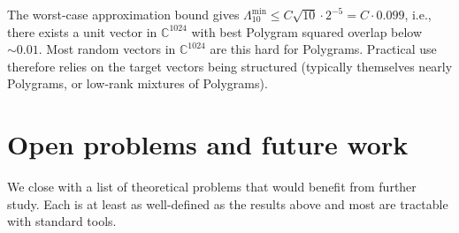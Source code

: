 \documentclass[11pt,letterpaper]{article}
\theoremstyle{definition}
\newcommand{\C}{\mathbb{C}}
\begin{document}
The worst-case approximation bound gives $\Lambda^{\min}_{10} \leq C \sqrt{10}
\cdot 2^{-5} = C \cdot 0.099$, i.e., there exists a unit vector in $\C^{1024}$
with best Polygram squared overlap below $\sim 0.01$. Most random vectors
in $\C^{1024}$ are this hard for Polygrams. Practical use therefore relies on
the target vectors being structured (typically themselves nearly Polygrams,
or low-rank mixtures of Polygrams).

\section{Open problems and future work}
\label{sec:open}

We close with a list of theoretical problems that would benefit from further
study. Each is at least as well-defined as the results above and most are
tractable with standard tools.
\end{document}
